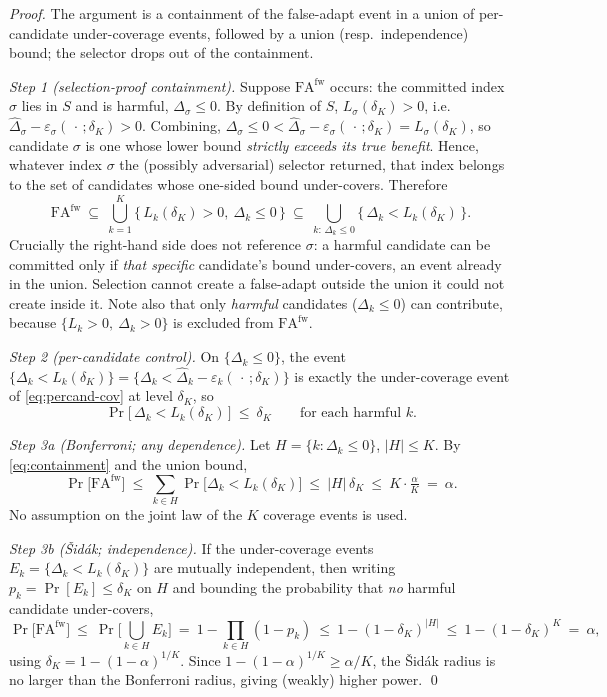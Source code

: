 \begin{proof}
The argument is a containment of the false-adapt event in a union of per-candidate
under-coverage events, followed by a union (resp.\ independence) bound; the selector
drops out of the containment.

\emph{Step 1 (selection-proof containment).} Suppose $\mathrm{FA}^{\mathrm{fw}}$ occurs:
the committed index $\sigma$ lies in $S$ and is harmful, $\Delta_\sigma\le0$. By definition
of $S$, $L_\sigma(\delta_K)>0$, i.e.\ $\hat\Delta_\sigma-\varepsilon_\sigma(\,\cdot\,;\delta_K)>0$.
Combining, $\Delta_\sigma\le0<\hat\Delta_\sigma-\varepsilon_\sigma(\,\cdot\,;\delta_K)=L_\sigma(\delta_K)$,
so candidate $\sigma$ is one whose lower bound \emph{strictly exceeds its true benefit}.
Hence, whatever index $\sigma$ the (possibly adversarial) selector returned, that index
belongs to the set of candidates whose one-sided bound under-covers. Therefore
\begin{equation}\label{eq:containment}
\mathrm{FA}^{\mathrm{fw}}\ \subseteq\ \bigcup_{k=1}^{K}\big\{\,L_k(\delta_K)>0,\ \Delta_k\le0\,\big\}
\ \subseteq\ \bigcup_{k:\,\Delta_k\le0}\big\{\,\Delta_k<L_k(\delta_K)\,\big\}.
\end{equation}
Crucially the right-hand side does not reference $\sigma$: a harmful candidate can be
committed only if \emph{that specific} candidate's bound under-covers, an event already in
the union. Selection cannot create a false-adapt outside the union it could not create
inside it. Note also that only \emph{harmful} candidates ($\Delta_k\le0$) can contribute,
because $\{L_k>0,\ \Delta_k>0\}$ is excluded from $\mathrm{FA}^{\mathrm{fw}}$.

\emph{Step 2 (per-candidate control).} On $\{\Delta_k\le0\}$, the event
$\{\Delta_k<L_k(\delta_K)\}=\{\Delta_k<\hat\Delta_k-\varepsilon_k(\,\cdot\,;\delta_K)\}$ is
exactly the under-coverage event of \eqref{eq:percand-cov} at level $\delta_K$, so
\[
\Pr\big[\,\Delta_k<L_k(\delta_K)\,\big]\ \le\ \delta_K\qquad\text{for each harmful }k.
\]

\emph{Step 3a (Bonferroni; any dependence).} Let $H=\{k:\Delta_k\le0\}$, $|H|\le K$.
By \eqref{eq:containment} and the union bound,
\[
\Pr\big[\mathrm{FA}^{\mathrm{fw}}\big]\ \le\
\sum_{k\in H}\Pr\big[\Delta_k<L_k(\delta_K)\big]\ \le\ |H|\,\delta_K\ \le\ K\cdot\tfrac{\alpha}{K}\ =\ \alpha .
\]
No assumption on the joint law of the $K$ coverage events is used.

\emph{Step 3b (\v Sid\'ak; independence).} If the under-coverage events
$E_k=\{\Delta_k<L_k(\delta_K)\}$ are mutually independent, then writing $p_k=\Pr[E_k]\le\delta_K$
on $H$ and bounding the probability that \emph{no} harmful candidate under-covers,
\[
\Pr\big[\mathrm{FA}^{\mathrm{fw}}\big]\ \le\ \Pr\!\Big[\bigcup_{k\in H}E_k\Big]
\ =\ 1-\prod_{k\in H}(1-p_k)\ \le\ 1-(1-\delta_K)^{|H|}\ \le\ 1-(1-\delta_K)^{K}\ =\ \alpha,
\]
using $\delta_K=1-(1-\alpha)^{1/K}$. Since $1-(1-\alpha)^{1/K}\ge\alpha/K$, the \v Sid\'ak
radius is no larger than the Bonferroni radius, giving (weakly) higher power. \qed
\end{proof}

